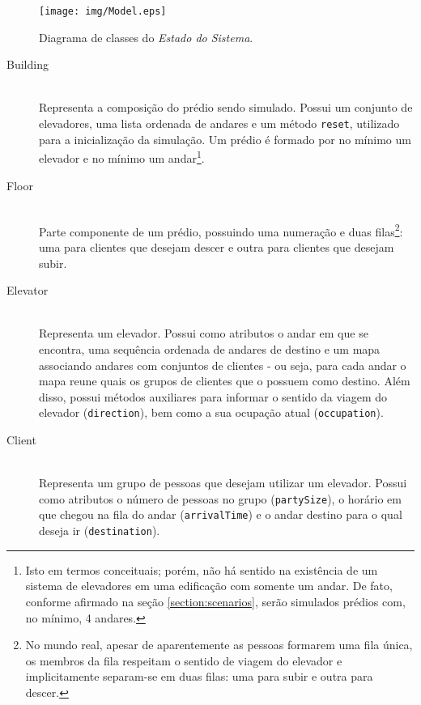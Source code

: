 \begin{figure}[htb!]
  \centering
  \texttt{[image: img/Model.eps]}
  \caption{Diagrama de classes do \textit{Estado do Sistema}.}
\label{fig:diagram:model}
\end{figure}

\begin{description}
  \item[Building] \hfill \\
    Representa a composição do prédio sendo simulado. Possui um conjunto de
    elevadores, uma lista ordenada de andares e um método \texttt{reset},
    utilizado para a inicialização da simulação. Um prédio é formado por no
    mínimo um elevador e no mínimo um andar\footnote{Isto em termos conceituais;
    porém, não há sentido na existência de um sistema de elevadores em uma
    edificação com somente um andar. De fato, conforme afirmado na seção
    \ref{section:scenarios}, serão simulados prédios com, no mínimo, 4
    andares.}.

  \item[Floor] \hfill \\
    Parte componente de um prédio, possuindo uma numeração e duas
    filas\footnote{No mundo real, apesar de aparentemente as pessoas formarem
    uma fila única, os membros da fila respeitam o sentido de viagem do elevador
    e implicitamente separam-se em duas filas: uma para subir e outra para
    descer.}: uma para clientes que desejam descer e outra para clientes que
    desejam subir.

\item[Elevator] \hfill \\
    Representa um elevador. Possui como atributos o andar em que se
    encontra, uma sequência ordenada de andares de destino e um mapa associando
    andares com conjuntos de clientes - ou seja, para cada andar o mapa reune
    quais os grupos de clientes que o possuem como destino. Além disso, possui
    métodos auxiliares para informar o sentido da viagem do elevador
    (\texttt{direction}), bem como a sua ocupação atual (\texttt{occupation}).

\item[Client] \hfill \\
    Representa um grupo de pessoas que desejam utilizar um elevador. Possui como
    atributos o número de pessoas no grupo (\texttt{partySize}), o horário em
    que chegou na fila do andar (\texttt{arrivalTime}) e o andar destino para o
    qual deseja ir (\texttt{destination}).

\end{description}

